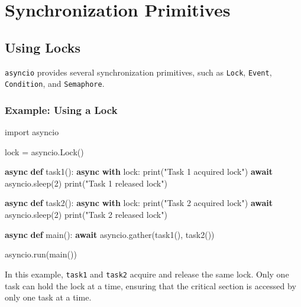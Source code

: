 \documentclass[
  letterpaper,
  DIV=11,
  numbers=noendperiod]{scrreprt}
\newenvironment{Shaded}{\begin{snugshade}}{\end{snugshade}}
\newcommand{\BuiltInTok}[1]{\textcolor[rgb]{0.00,0.23,0.31}{#1}}
\newcommand{\ControlFlowTok}[1]{\textcolor[rgb]{0.00,0.23,0.31}{\textbf{#1}}}
\newcommand{\DecValTok}[1]{\textcolor[rgb]{0.68,0.00,0.00}{#1}}
\newcommand{\ImportTok}[1]{\textcolor[rgb]{0.00,0.46,0.62}{#1}}
\newcommand{\KeywordTok}[1]{\textcolor[rgb]{0.00,0.23,0.31}{\textbf{#1}}}
\newcommand{\NormalTok}[1]{\textcolor[rgb]{0.00,0.23,0.31}{#1}}
\newcommand{\OperatorTok}[1]{\textcolor[rgb]{0.37,0.37,0.37}{#1}}
\newcommand{\StringTok}[1]{\textcolor[rgb]{0.13,0.47,0.30}{#1}}
\begin{document}
\section{Synchronization Primitives}\label{synchronization-primitives}

\subsection{Using Locks}\label{using-locks}

\texttt{asyncio} provides several synchronization primitives, such as
\texttt{Lock}, \texttt{Event}, \texttt{Condition}, and
\texttt{Semaphore}.

\subsubsection{Example: Using a Lock}\label{example-using-a-lock}

\begin{Shaded}
\begin{Highlighting}[]
\ImportTok{import}\NormalTok{ asyncio}

\NormalTok{lock }\OperatorTok{=}\NormalTok{ asyncio.Lock()}

\ControlFlowTok{async} \KeywordTok{def}\NormalTok{ task1():}
    \ControlFlowTok{async} \ControlFlowTok{with}\NormalTok{ lock:}
        \BuiltInTok{print}\NormalTok{(}\StringTok{"Task 1 acquired lock"}\NormalTok{)}
        \ControlFlowTok{await}\NormalTok{ asyncio.sleep(}\DecValTok{2}\NormalTok{)}
        \BuiltInTok{print}\NormalTok{(}\StringTok{"Task 1 released lock"}\NormalTok{)}

\ControlFlowTok{async} \KeywordTok{def}\NormalTok{ task2():}
    \ControlFlowTok{async} \ControlFlowTok{with}\NormalTok{ lock:}
        \BuiltInTok{print}\NormalTok{(}\StringTok{"Task 2 acquired lock"}\NormalTok{)}
        \ControlFlowTok{await}\NormalTok{ asyncio.sleep(}\DecValTok{2}\NormalTok{)}
        \BuiltInTok{print}\NormalTok{(}\StringTok{"Task 2 released lock"}\NormalTok{)}

\ControlFlowTok{async} \KeywordTok{def}\NormalTok{ main():}
    \ControlFlowTok{await}\NormalTok{ asyncio.gather(task1(), task2())}

\NormalTok{asyncio.run(main())}
\end{Highlighting}
\end{Shaded}

In this example, \texttt{task1} and \texttt{task2} acquire and release
the same lock. Only one task can hold the lock at a time, ensuring that
the critical section is accessed by only one task at a time.
\end{document}
